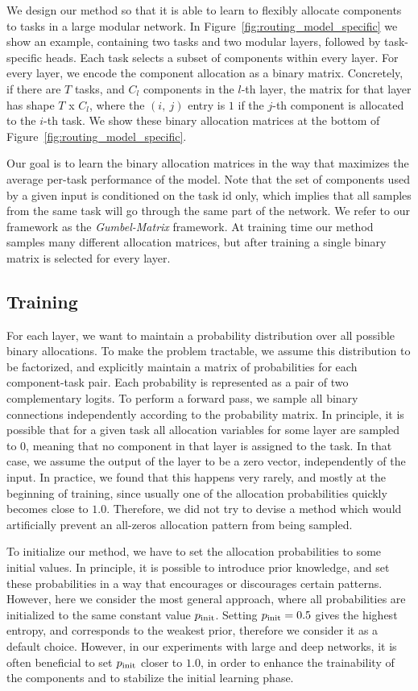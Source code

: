 \documentclass[conference]{IEEEtran}
\begin{document}
We design our method so that it is able to learn to flexibly allocate components to tasks in a large modular network. In Figure~\ref{fig:routing_model_specific} we show an example, containing two tasks and two modular layers, followed by task-specific heads. Each task selects a subset of components within every layer. For every layer, we encode the component allocation as a binary matrix. Concretely, if there are $T$ tasks, and $C_l$ components in the $l$-th layer, the matrix for that layer has shape $T$ x $C_l$, where the $(i,~j)$ entry is $1$ if the $j$-th component is allocated to the $i$-th task. We show these binary allocation matrices at the bottom of Figure~\ref{fig:routing_model_specific}.

Our goal is to learn the binary allocation matrices in the way that maximizes the average per-task performance of the model.
Note that the set of components used by a given input is conditioned on the task id only, which implies that all samples from the same task will go through the same part of the network. We refer to our framework as the \textit{Gumbel-Matrix} framework.
At training time our method samples many different allocation matrices, but after training a single binary matrix is selected for every layer.

\subsection{Training}

For each layer, we want to maintain a probability distribution over all possible binary allocations. To make the problem tractable, we assume this distribution to be factorized, and explicitly maintain a matrix of probabilities for each component-task pair. Each probability is represented as a pair of two complementary logits. To perform a forward pass, we sample all binary connections independently according to the probability matrix. In principle, it is possible that for a given task all allocation variables for some layer are sampled to $0$, meaning that no component in that layer is assigned to the task. In that case, we assume the output of the layer to be a zero vector, independently of the input. In practice, we found that this happens very rarely, and mostly at the beginning of training, since usually one of the allocation probabilities quickly becomes close to $1.0$. Therefore, we did not try to devise a method which would artificially prevent an all-zeros allocation pattern from being sampled.

To initialize our method, we have to set the allocation probabilities to some initial values. In principle, it is possible to introduce prior knowledge, and set these probabilities in a way that encourages or discourages certain patterns. However, here we consider the most general approach, where all probabilities are initialized to the same constant value $p_{\rm init}$. Setting $p_{\rm init} = 0.5$ gives the highest entropy, and corresponds to the weakest prior, therefore we consider it as a default choice. However, in our experiments with large and deep networks, it is often beneficial to set $p_{\rm init}$ closer to $1.0$, in order to enhance the trainability of the components and to stabilize the initial learning phase.
\end{document}
